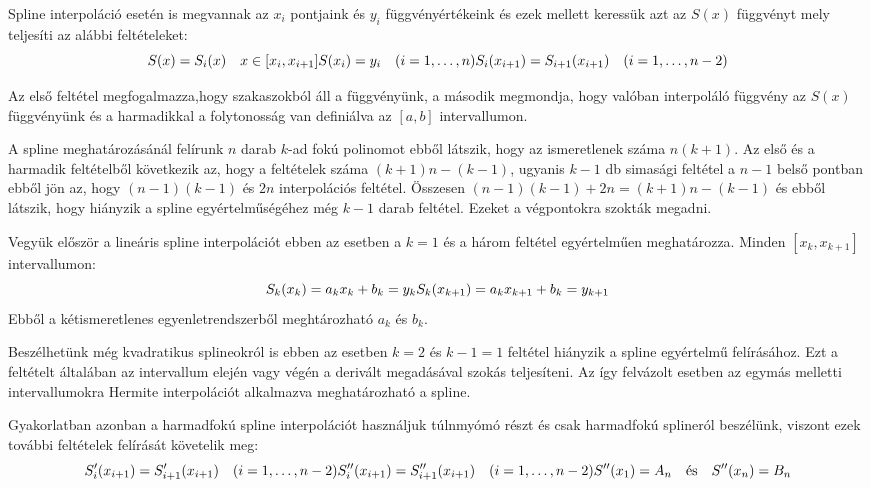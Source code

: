     Spline interpoláció esetén is megvannak az \(x_i\) pontjaink és \(y_i\)
függvényértékeink és ezek mellett keressük azt az \(S(x)\) függvényt
mely teljesíti az alábbi feltételeket: \[
S(x)= S_i(x)\quad x\in[x_i, x_{i+1}]\\
S(x_i)= y_i\quad (i=1, \dots, n)\\
S_i(x_{i+1})= S_{i+1}(x_{i+1})\quad (i=1, \dots, n-2)\\
\]

    Az első feltétel megfogalmazza,hogy szakaszokból áll a függvényünk, a
második megmondja, hogy valóban interpoláló függvény az \(S(x)\)
függvényünk és a harmadikkal a folytonosság van definiálva az \([a,b]\)
intervallumon.

    A spline meghatározásánál felírunk \(n\) darab \(k\)-ad fokú polinomot
ebből látszik, hogy az ismeretlenek száma \(n(k+1)\). Az első és a
harmadik feltételből következik az, hogy a feltételek száma
\((k+1)n-(k-1)\), ugyanis \(k-1\) db simasági feltétel a \(n-1\) belső
pontban ebből jön az, hogy \((n-1)(k-1)\) és \(2n\) interpolációs
feltétel. Összesen \((n-1)(k-1)+2n=(k+1)n-(k-1)\) és ebből látszik, hogy
hiányzik a spline egyértelműségéhez még \(k-1\) darab feltétel. Ezeket a
végpontokra szokták megadni.

    Vegyük először a lineáris spline interpolációt ebben az esetben a
\(k=1\) és a három feltétel egyértelműen meghatározza. Minden
\([x_k, x_{k+1}]\) intervallumon: \[
S_k(x_k)=a_kx_k+b_k=y_k \\
S_k(x_{k+1})=a_kx_{k+1}+b_k=y_{k+1}\\
\] Ebből a kétismeretlenes egyenletrendszerből meghtározható \(a_k\) és
\(b_k\).

    Beszélhetünk még kvadratikus splineokról is ebben az esetben \(k=2\) és
\(k-1 = 1\) feltétel hiányzik a spline egyértelmű felírásához. Ezt a
feltételt általában az intervallum elején vagy végén a derivált
megadásával szokás teljesíteni. Az így felvázolt esetben az egymás
melletti intervallumokra Hermite interpolációt alkalmazva meghatározható
a spline.

    Gyakorlatban azonban a harmadfokú spline interpolációt használjuk
túlnmyómó részt és csak harmadfokú splineról beszélünk, viszont ezek
további feltételek felírását követelik meg: \[
S_i'(x_{i+1})= S_{i+1}'(x_{i+1})\quad (i=1, \dots, n-2)\\
S_i''(x_{i+1})= S_{i+1}''(x_{i+1})\quad (i=1, \dots, n-2)\\
S''(x_{1})= A_n \quad \textrm{és} \quad S''(x_{n})=B_n
\]

